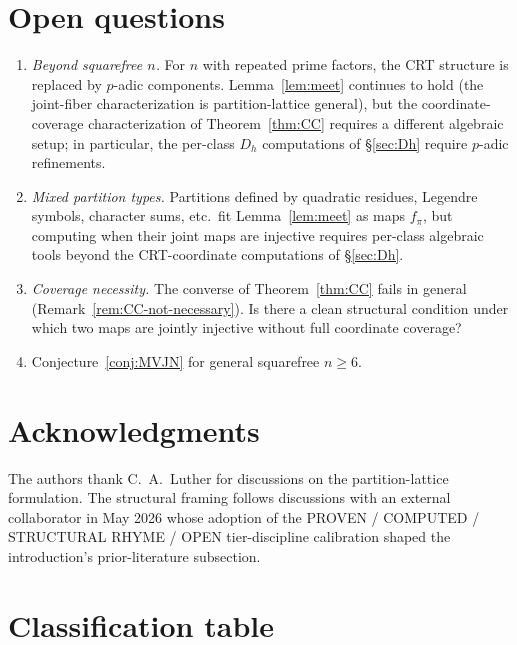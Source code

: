 \documentclass[11pt,reqno]{amsart}
\theoremstyle{plain}
\theoremstyle{definition}
\begin{document}
\section{Open questions} \label{sec:open}

\begin{enumerate}[label=(\alph*)]
\item \emph{Beyond squarefree $n$.} For $n$ with repeated prime
factors, the CRT structure is replaced by $p$-adic components.
Lemma~\ref{lem:meet} continues to hold (the joint-fiber characterization
is partition-lattice general), but the coordinate-coverage
characterization of Theorem~\ref{thm:CC} requires a different
algebraic setup; in particular, the per-class $D_h$ computations of
\S\ref{sec:Dh} require $p$-adic refinements.
\item \emph{Mixed partition types.} Partitions defined by quadratic
residues, Legendre symbols, character sums, etc.\ fit
Lemma~\ref{lem:meet} as maps $f_{\pi}$, but computing when their
joint maps are injective requires per-class algebraic tools beyond
the CRT-coordinate computations of \S\ref{sec:Dh}.
\item \emph{Coverage necessity.} The converse of Theorem~\ref{thm:CC}
fails in general (Remark~\ref{rem:CC-not-necessary}). Is there a
clean structural condition under which two maps are jointly injective
without full coordinate coverage?
\item Conjecture~\ref{conj:MVJN} for general squarefree $n \geq 6$.
\end{enumerate}

\section*{Acknowledgments}

The authors thank C.\ A.\ Luther for discussions on the
partition-lattice formulation. The structural framing follows
discussions with an external collaborator in May 2026 whose adoption
of the PROVEN / COMPUTED / STRUCTURAL RHYME / OPEN tier-discipline
calibration shaped the introduction's prior-literature subsection.

\section*{Classification table}
\end{document}
